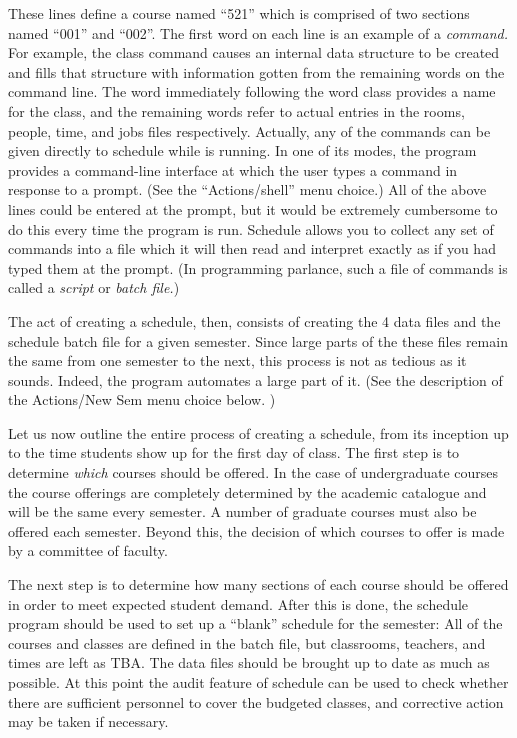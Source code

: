 These lines define a course named ``521'' which is comprised of two
sections named ``001'' and ``002''. The first word on each line is an
example of a {\it command.} For example, the class command causes an
internal data structure to be created and fills that structure with
information gotten from the remaining words on the command line. The word
immediately following the word class provides a name for the class, and
the remaining words refer to actual entries in the rooms, people, time, and
jobs files respectively. Actually, any of the
commands can be given directly to schedule while is running. In one of its
modes, the program provides a command-line interface at which the user
types a command in response to a prompt. (See the ``Actions/shell'' menu
 choice.) All of the above lines could be entered at the prompt, but it
would be extremely cumbersome to do this every time the program is run. 
Schedule allows you to collect any set of commands into a file which it will
then read and interpret exactly as if you had typed them at the prompt. (In
programming parlance, such a file of commands is called a {\it script} or
{\it batch file.})

The act of creating a schedule, then, consists of creating the 4 data files
and the schedule batch file for a given semester. Since large parts of
the these files remain the same from one semester to the next, this process
is not as tedious as it sounds. Indeed, the program automates a large part
of it. (See the description of the Actions/New Sem menu choice below. )

Let us now outline the entire process of creating a schedule, from its inception
up to the time students show up for the first day of class. The first step
is to determine {\it which } courses should be offered. In the case of
undergraduate courses the course offerings are completely determined by the
academic catalogue  and will be the same every semester. A number of
graduate courses must also be offered each semester. Beyond this, the
decision of which courses to offer is made by a committee of faculty. 

The next step is to determine how many sections of each course should be
offered in order to meet expected student demand. After this is done, the
schedule program should be used to set up a ``blank'' schedule for the
semester: All of the courses and classes are defined in the batch file, but
classrooms, teachers, and times are left as TBA. The data files should be
brought up to date as much as possible. At this point the audit feature of
schedule can be used to check whether there are sufficient personnel to
cover the budgeted classes, and  corrective action may be taken if necessary. 

